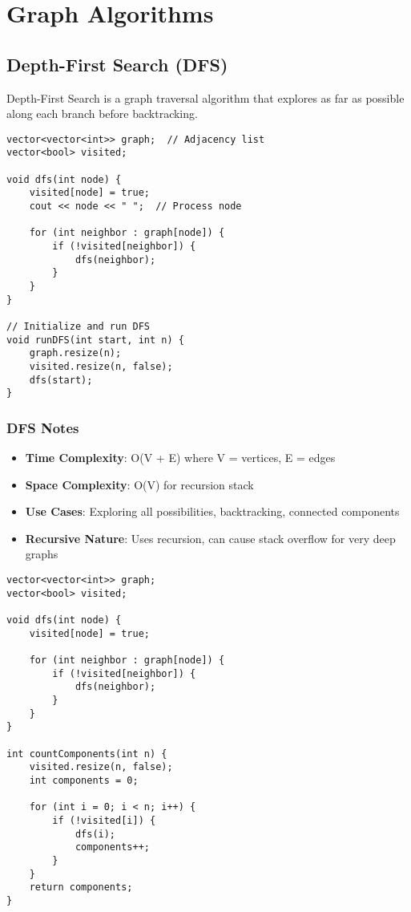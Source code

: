 \documentclass[11pt,a4paper]{article}
\begin{document}
\newpage

\section{Graph Algorithms}

\subsection{Depth-First Search (DFS)}
Depth-First Search is a graph traversal algorithm that explores as far as possible along each branch before backtracking.

\begin{lstlisting}[caption={DFS Implementation}]
vector<vector<int>> graph;  // Adjacency list
vector<bool> visited;

void dfs(int node) {
    visited[node] = true;
    cout << node << " ";  // Process node
    
    for (int neighbor : graph[node]) {
        if (!visited[neighbor]) {
            dfs(neighbor);
        }
    }
}

// Initialize and run DFS
void runDFS(int start, int n) {
    graph.resize(n);
    visited.resize(n, false);
    dfs(start);
}
\end{lstlisting}

\subsubsection{DFS Notes}
\begin{itemize}
\item \textbf{Time Complexity}: O(V + E) where V = vertices, E = edges
\item \textbf{Space Complexity}: O(V) for recursion stack
\item \textbf{Use Cases}: Exploring all possibilities, backtracking, connected components
\item \textbf{Recursive Nature}: Uses recursion, can cause stack overflow for very deep graphs
\end{itemize}

\newpage
\begin{lstlisting}[caption={DFS with Connected Components}]
vector<vector<int>> graph;
vector<bool> visited;

void dfs(int node) {
    visited[node] = true;
    
    for (int neighbor : graph[node]) {
        if (!visited[neighbor]) {
            dfs(neighbor);
        }
    }
}

int countComponents(int n) {
    visited.resize(n, false);
    int components = 0;
    
    for (int i = 0; i < n; i++) {
        if (!visited[i]) {
            dfs(i);
            components++;
        }
    }
    return components;
}
\end{lstlisting}
\end{document}
